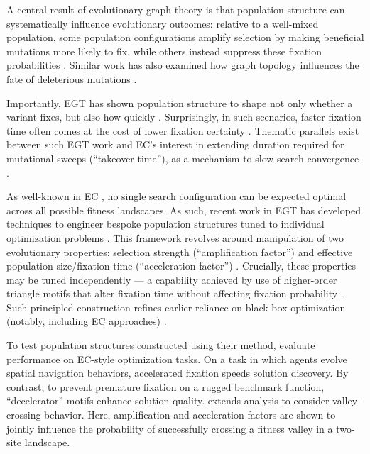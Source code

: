 A central result of evolutionary graph theory is that population structure can systematically influence evolutionary outcomes: relative to a well-mixed population, some population configurations amplify selection by making beneficial mutations more likely to fix, while others instead suppress these fixation probabilities \citep{lieberman2005evolutionary,pavlogiannis2018construction,allen2017evolutionary}.
Similar work has also examined how graph topology influences the fate of deleterious mutations \citep{sharma2022suppressors}.

Importantly, EGT has shown population structure to shape not only whether a variant fixes, but also how quickly \citep{askari2015analytical}.
Surprisingly, in such scenarios, faster fixation time often comes at the cost of lower fixation certainty \citep{frean2013effect}.
Thematic parallels exist between such EGT work and EC's interest in extending duration required for mutational sweeps (``takeover time''), as a mechanism to slow search convergence \citep{goldberg1991comparative,rudolph2001takeover,giacobini2005selection,sudholt2015parallel}.

As well-known in EC \citep{wolpert1997no}, no single search configuration can be expected optimal across all possible fitness landscapes.
As such, recent work in EGT has developed techniques to engineer bespoke population structures tuned to individual optimization problems \citep{kuo2024theory,kuo2024evolutionary}.
This framework revolves around manipulation of two evolutionary properties: selection strength (``amplification factor'') \citep{kuo2024theory} and effective population size/fixation time (``acceleration factor'') \citep{kuo2024evolutionary}.
Crucially, these properties may be tuned independently --- a capability achieved by use of higher-order triangle motifs that alter fixation time without affecting fixation probability \citep{kuo2024evolutionary}.
Such principled construction refines earlier reliance on black box optimization (notably, including EC approaches) \citep{moller2019exploring}.

To test population structures constructed using their method, \citet{kuo2024evolutionary} evaluate performance on EC-style optimization tasks.
On a task in which agents evolve spatial navigation behaviors, accelerated fixation speeds solution discovery.
By contrast, to prevent premature fixation on a rugged benchmark function, ``decelerator'' motifs enhance solution quality.
\citet{kuo2024evolutionarymutation} extends analysis to consider valley-crossing behavior.
Here, amplification and acceleration factors are shown to jointly influence the probability of successfully crossing a fitness valley in a two-site landscape.

